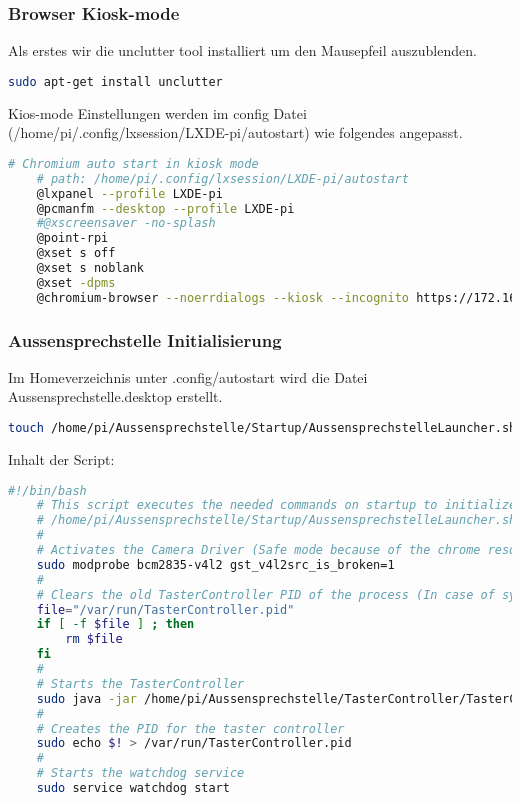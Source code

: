 \subsubsection{Browser Kiosk-mode}
Als erstes wir die unclutter tool installiert um den Mausepfeil auszublenden.
\begin{lstlisting}[backgroundcolor = \color{snippetcolor},
language = bash,
xleftmargin = 1cm,
framexleftmargin = 0.1em,
breaklines=true]
	sudo apt-get install unclutter
\end{lstlisting}
Kios-mode Einstellungen werden im config Datei (/home/pi/.config/lxsession/LXDE-pi/autostart) wie folgendes angepasst.
\begin{lstlisting}[backgroundcolor = \color{snippetcolor},
language = bash,
xleftmargin = 1cm,
framexleftmargin = 0.1em,
breaklines=true]
	# Chromium auto start in kiosk mode
	# path: /home/pi/.config/lxsession/LXDE-pi/autostart
	@lxpanel --profile LXDE-pi
	@pcmanfm --desktop --profile LXDE-pi
	#@xscreensaver -no-splash
	@point-rpi
	@xset s off
	@xset s noblank
	@xset -dpms
	@chromium-browser --noerrdialogs --kiosk --incognito https://172.16.111.99/server
\end{lstlisting}

\subsubsection{Aussensprechstelle Initialisierung}
Im Homeverzeichnis unter .config/autostart wird die Datei Aussensprechstelle.desktop erstellt.
\begin{lstlisting}[backgroundcolor = \color{snippetcolor},
language = bash,
xleftmargin = 1cm,
framexleftmargin = 0.1em,
breaklines=true]
	touch /home/pi/Aussensprechstelle/Startup/AussensprechstelleLauncher.sh
\end{lstlisting}
Inhalt der Script:
\begin{lstlisting}[backgroundcolor = \color{snippetcolor},
language = bash,
xleftmargin = 1cm,
framexleftmargin = 0.1em,
breaklines=true]
	#!/bin/bash
	# This script executes the needed commands on startup to initialize the Aussensprechstelle
	# /home/pi/Aussensprechstelle/Startup/AussensprechstelleLauncher.sh
	#
	# Activates the Camera Driver (Safe mode because of the chrome resolution bug)
	sudo modprobe bcm2835-v4l2 gst_v4l2src_is_broken=1
	#
	# Clears the old TasterController PID of the process (In case of system shutdown)
	file="/var/run/TasterController.pid"
	if [ -f $file ] ; then
		rm $file
	fi
	#
	# Starts the TasterController
	sudo java -jar /home/pi/Aussensprechstelle/TasterController/TasterController.jar &
	#
	# Creates the PID for the taster controller
	sudo echo $! > /var/run/TasterController.pid
	#
	# Starts the watchdog service
	sudo service watchdog start	
\end{lstlisting}

